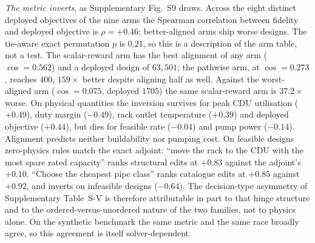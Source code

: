 \documentclass[journal]{IEEEtran}
\begin{document}
\emph{The metric inverts}, as Supplementary Fig.~S9 draws.  Across the eight distinct deployed objectives of the
nine arms the Spearman correlation between fidelity and deployed objective is
$\rho=+0.46$: better-aligned arms ship worse designs.  The tie-aware exact
permutation $p$ is $0.21$, so this is a description of the arm table, not a test.
The scalar-reward arm has the best alignment of any arm ($\cos=0.562$) and a
deployed design of $63{,}501$; the pathwise arm, at $\cos=0.273$, reaches $400$,
$159\times$ better despite aligning half as well.  Against the worst-aligned arm
($\cos=0.075$, deployed $1705$) the same scalar-reward arm is $37.2\times$
worse.  On physical quantities the inversion survives for peak CDU utilisation
($+0.49$), duty margin ($-0.49$), rack outlet temperature ($+0.39$) and deployed
objective ($+0.44$), but dies for feasible rate ($-0.04$) and pump power
($-0.14$).  Alignment predicts neither buildability nor pumping cost.  On
feasible designs zero-physics rules match the exact adjoint: ``move the rack to
the CDU with the most spare rated capacity'' ranks structural edits at $+0.83$
against the adjoint's $+0.10$.  ``Choose the cheapest pipe class'' ranks
catalogue edits at $+0.85$ against $+0.92$, and inverts on infeasible designs
($-0.64$).  The decision-type asymmetry of Supplementary Table~S-V is therefore
attributable in part to that hinge structure and to the ordered-versus-unordered
nature of the two families, not to physics alone.  On the synthetic benchmark the same metric and the same race broadly agree, so
this agreement is itself solver-dependent.
\end{document}
